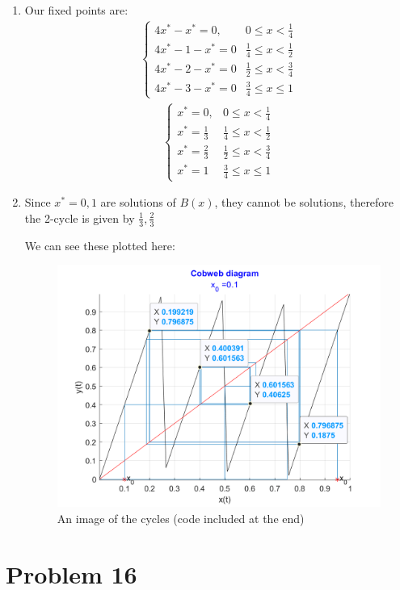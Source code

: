 \documentclass[12pt,letterpaper]{article}
\theoremstyle{definition}
\begin{document}
\begin{changemargin}{.5cm}{0cm}
\begin{enumerate}[label=(\alph*)]
    \item Our fixed points are:
    \begin{align*}
         \begin{cases}
         4x^*-x^*=0, & 0\leq x < \frac 1 4\\
         4x^* -1 - x^* = 0 & \frac 1 4 \leq x < \frac 1 2 \\
         4x^*-2 - x^*=0 & \frac 1 2 \leq x < \frac 3 4\\
        4x^* -3-x^*=0 & \frac 3 4 \leq x \leq 1
        \end{cases}
    \end{align*}
    \begin{align*}
         \begin{cases}
         x^*=0, & 0\leq x < \frac 1 4\\
         x^*=\frac 1 3 & \frac 1 4 \leq x < \frac 1 2 \\
         x^*=\frac 2 3    & \frac 1 2 \leq x < \frac 3 4\\
         x^* = 1  & \frac 3 4 \leq x \leq 1
        \end{cases}
    \end{align*}
    \item Since $x^*=0,1$ are solutions of $B(x)$, they cannot be solutions, therefore the 2-cycle is given by $\frac{1}{3},\frac{2}{3}$
    
    We can see these plotted here:
    \begin{figure}[H]
        \centering
        \includegraphics[width=.6\textwidth]{images/problem_15_cycles.png}
        \caption{An image of the cycles (code included at the end)}
        \label{fig:b2cycles}
    \end{figure}
\end{enumerate}


    \end{changemargin}

\section*{Problem 16}
\end{document}
